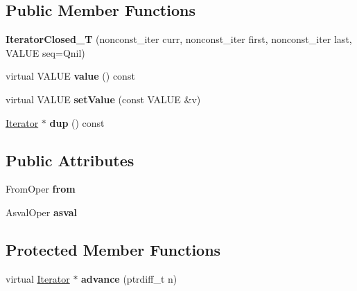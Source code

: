 \subsection*{Public Member Functions}
\begin{DoxyCompactItemize}
\item 
{\bfseries Iterator\+Closed\+\_\+T} (nonconst\+\_\+iter curr, nonconst\+\_\+iter first, nonconst\+\_\+iter last, V\+A\+L\+UE seq=Qnil)\hypertarget{classswig_1_1IteratorClosed__T_aea2b88be92ec5f9ac406797888d2b637}{}\label{classswig_1_1IteratorClosed__T_aea2b88be92ec5f9ac406797888d2b637}

\item 
virtual V\+A\+L\+UE {\bfseries value} () const \hypertarget{classswig_1_1IteratorClosed__T_a4c1a8927c2f2d4a46f988b6de0fbeb81}{}\label{classswig_1_1IteratorClosed__T_a4c1a8927c2f2d4a46f988b6de0fbeb81}

\item 
virtual V\+A\+L\+UE {\bfseries set\+Value} (const V\+A\+L\+UE \&v)\hypertarget{classswig_1_1IteratorClosed__T_a82234ebf05614bd94ca389cb9d977027}{}\label{classswig_1_1IteratorClosed__T_a82234ebf05614bd94ca389cb9d977027}

\item 
\hyperlink{structswig_1_1Iterator}{Iterator} $\ast$ {\bfseries dup} () const \hypertarget{classswig_1_1IteratorClosed__T_a380d2c9f4a64121fb09cb6b4f4a45222}{}\label{classswig_1_1IteratorClosed__T_a380d2c9f4a64121fb09cb6b4f4a45222}

\end{DoxyCompactItemize}
\subsection*{Public Attributes}
\begin{DoxyCompactItemize}
\item 
From\+Oper {\bfseries from}\hypertarget{classswig_1_1IteratorClosed__T_a8280814922466ef875a9dd873a60ddf6}{}\label{classswig_1_1IteratorClosed__T_a8280814922466ef875a9dd873a60ddf6}

\item 
Asval\+Oper {\bfseries asval}\hypertarget{classswig_1_1IteratorClosed__T_ad5fa48cb2a5b28d8418666efc02f967b}{}\label{classswig_1_1IteratorClosed__T_ad5fa48cb2a5b28d8418666efc02f967b}

\end{DoxyCompactItemize}
\subsection*{Protected Member Functions}
\begin{DoxyCompactItemize}
\item 
virtual \hyperlink{structswig_1_1Iterator}{Iterator} $\ast$ {\bfseries advance} (ptrdiff\+\_\+t n)\hypertarget{classswig_1_1IteratorClosed__T_aee861d0c0f173828c076d59f83e53c27}{}\label{classswig_1_1IteratorClosed__T_aee861d0c0f173828c076d59f83e53c27}

\end{DoxyCompactItemize}
